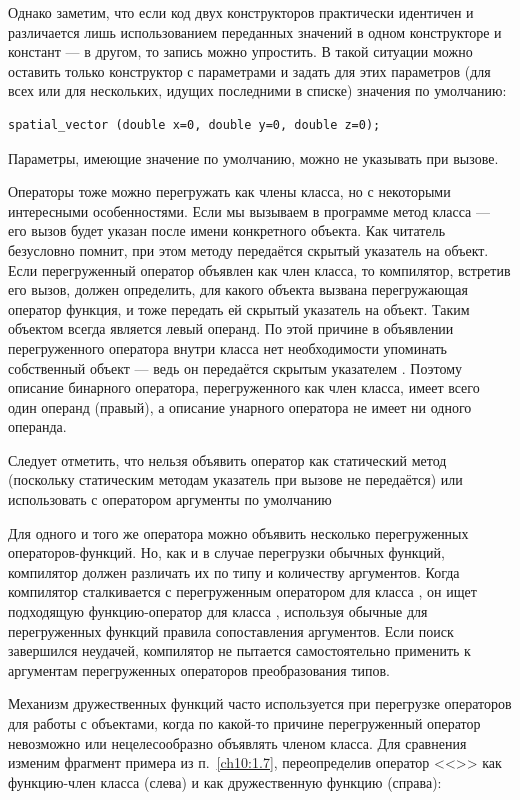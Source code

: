 Однако заметим, что если код двух конструкторов практически идентичен и различается лишь использованием переданных
значений в одном конструкторе и констант --- в другом, то запись можно упростить. В такой ситуации можно оставить только
конструктор с параметрами и задать для этих параметров (для всех или для нескольких, идущих последними в списке)
значения по умолчанию:
\begin{lstlisting}
spatial_vector (double x=0, double y=0, double z=0);
\end{lstlisting}

Параметры, имеющие значение по умолчанию, можно не указывать при вызове.

Операторы тоже можно перегружать как члены класса, но с некоторыми интересными особенностями. Если мы вызываем в
программе метод класса --- его вызов  будет указан после имени конкретного объекта. Как читатель безусловно помнит, при
этом методу передаётся скрытый указатель на объект. Если перегруженный оператор объявлен как член класса, то
компилятор, встретив его вызов, должен определить, для какого объекта вызвана перегружающая оператор функция, и тоже
передать ей скрытый указатель на объект. Таким объектом всегда является левый операнд. По этой причине в объявлении
перегруженного оператора внутри класса нет необходимости упоминать собственный объект --- ведь он передаётся скрытым
указателем . Поэтому описание бинарного оператора, перегруженного как член класса, имеет
всего один операнд (правый), а описание унарного оператора не имеет ни одного операнда. 

Следует отметить, что нельзя объявить оператор как статический метод (поскольку статическим методам указатель
 при вызове не передаётся) или использовать с оператором аргументы по умолчанию

Для одного и того же оператора можно объявить несколько перегруженных операторов-функций. Но, как и в случае перегрузки
обычных функций, компилятор должен различать их по типу и количеству аргументов. Когда компилятор сталкивается с
перегруженным оператором для класса , он ищет  подходящую функцию-оператор для класса
, используя обычные для перегруженных функций правила сопоставления аргументов. Если поиск
завершился неудачей,  компилятор не пытается самостоятельно применить к аргументам перегруженных операторов
преобразования типов.

Механизм дружественных функций часто используется при перегрузке операторов для работы с объектами,
когда по какой-то причине перегруженный оператор невозможно или нецелесообразно объявлять членом класса. Для сравнения
изменим фрагмент примера из п.~\ref{ch10:1.7}, переопределив оператор
<<\Sys{+}>> как функцию-член класса (слева) и как дружественную функцию (справа):

